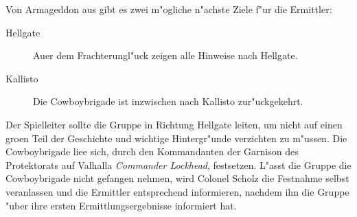 
Von Armageddon aus gibt es zwei m"ogliche n"achste Ziele f"ur die Ermittler:

\begin{description}
	\item [Hellgate] Au\3er dem Frachterungl"uck zeigen alle Hinweise nach Hellgate.
	\item [Kallisto] Die Cowboybrigade ist inzwischen nach Kallisto zur"uckgekehrt.
\end{description}

Der Spielleiter sollte die Gruppe in Richtung Hellgate leiten, um nicht auf einen gro\3en Teil der Geschichte und wichtige Hintergr"unde verzichten zu m"ussen. Die Cowboybrigade lie\3e sich, durch den Kommandanten der Garnison des Protektorats auf Valhalla \textit{Commander Lockhead}, festsetzen. L"asst die Gruppe die Cowboybrigade nicht gefangen nehmen, wird Colonel Scholz die Festnahme selbst veranlassen und die Ermittler entsprechend informieren, nachdem ihn die Gruppe "uber ihre ersten Ermittlungsergebnisse informiert hat.
\vfill